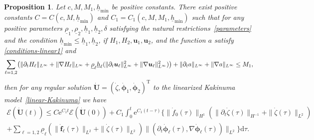 \documentclass[11pt,leqno]{article}
\newtheorem{proposition}[theorem]{\bf Proposition}
\numberwithin{equation}{section}
\numberwithin{figure}{section}
\begin{document}
\begin{proposition}\label{L.energy-estimate}
Let $c,M,M_1,\underline{h}_\mathrm{min}$ be positive constants. 
There exist positive constants $C=C(c,M,\underline{h}_\mathrm{min})$ and $C_1=C_1(c,M,M_1,\underline{h}_\mathrm{min})$ 
such that for any positive parameters $\underline{\rho}_1, \underline{\rho}_2, \underline{h}_1, \underline{h}_2, 
\delta$ satisfying the natural restrictions~\eqref{parameters} and the condition 
${\underline{h}_\mathrm{min} \leq \underline{h}_1, \underline{h}_2}$, if $H_1,H_2,\bm{u}_1,\bm{u}_2$, and the function $a$ satisfy 
\eqref{conditions-linear1} and 
%
\[
\sum_{\ell=1,2}\bigl( \|\partial_t H_\ell\|_{L^\infty} + \|\nabla H_\ell\|_{L^\infty} + \underline{\rho}_\ell\underline{h}_\ell
  (\|\partial_t\bm{u}_\ell\|_{L^\infty}^2+\|\nabla\bm{u}_\ell\|_{L^\infty}^2) \bigr)
  + \|\partial_t a\|_{L^\infty} + \|\nabla a\|_{L^\infty} \leq M_1, \\
\]
%
then for any regular solution $\dot{\bm{U}}=(\dot{\zeta},\dot{\bm{\phi}}_1,\dot{\bm{\phi}}_2)^\mathrm{T}$ to the 
linearized Kakinuma model~\eqref{linear-Kakinuma} we have 
%
\begin{multline*}
\mathscr{E}(\dot{\bm{U}}(t))
\leq C\mathrm{e}^{C_1t}\mathscr{E}(\dot{\bm{U}}(0))
 +C_1\int_0^t\mathrm{e}^{C_1(t-\tau)}\biggl\{ 
  \|\dot{f}_0(\tau)\|_{H^1}( \|\partial_t\dot{\zeta}(\tau)\|_{H^{-1}}+\|\dot{\zeta}(\tau)\|_{L^2} ) \\
 + \sum_{\ell=1,2}\underline{\rho}_\ell( \|\dot{\bm{f}}_\ell(\tau)\|_{L^2} + \|\dot{\zeta}(\tau)\|_{L^2})
  \|(\partial_t\dot{\bm{\phi}}_\ell(\tau),\nabla\dot{\bm{\phi}}_\ell(\tau))\|_{L^2} \biggr\}\mathrm{d}\tau.
\end{multline*}
\end{proposition}
\end{document}
